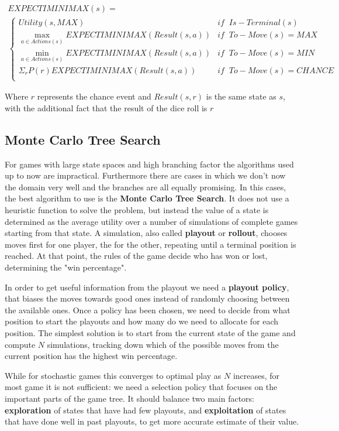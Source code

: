 \documentclass{article}
\begin{document}
\begin{multline}
    EXPECTIMINIMAX(s) = \\
    \begin{cases}
        Utility(s, MAX) & if \;\; Is-Terminal(s) \\
        \max_{a\in Actions(s)} EXPECTIMINIMAX(Result(s, a)) & if \;\; To-Move(s) = MAX \\
        \min_{a \in Actions(s)} EXPECTIMINIMAX(Result(s, a)) & if \;\; To-Move(s) = MIN \\
        \Sigma_{r}P(r) EXPECTIMINIMAX(Result(s, a)) & if\;\; To-Move(s) = CHANCE\\
    \end{cases}
\end{multline}

Where \(r\) represents the chance event and \(Result(s, r)\) is the same state as \(s\), with the additional fact that the result of the dice roll is \(r\)

\subsection{Monte Carlo Tree Search}
For games with large state spaces and high branching factor the algorithms used up to now are impractical. Furthermore there are cases in which we don't now the domain very well and the branches are all equally promising. In this cases, the best algorithm to use is the \textbf{Monte Carlo Tree Search}. It does not use a heuristic function to solve the problem, but instead the value of a state is determined as the average utility over a number of simulations of complete games starting from that state. A simulation, also called \textbf{playout} or \textbf{rollout}, chooses moves first for one player, the for the other, repeating until a terminal position is reached. At that point, the rules of the game decide who has won or lost, determining the "win percentage".

In order to get useful information from the playout we need a \textbf{playout policy}, that biases the moves towards good ones instead of randomly choosing between the available ones. Once a policy has been chosen, we need to decide from what position to start the playouts and how many do we need to allocate for each position. The simplest solution is to start from the current state of the game and compute \(N\) simulations, tracking down which of the possible moves from the current position has the highest win percentage.

While for stochastic games this converges to optimal play as \(N\) increases, for most game it is not sufficient: we need a selection policy that focuses on the important parts of the game tree. It should balance two main factors: \textbf{exploration} of states that have had few playouts, and \textbf{exploitation} of states that have done well in past playouts, to get more accurate estimate of their value.
\end{document}
